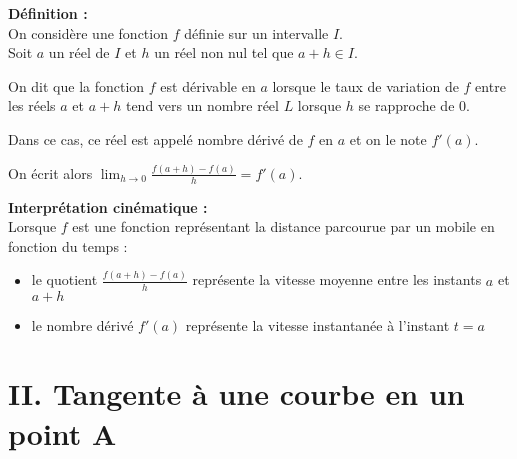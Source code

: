 \documentclass[11pt,a4paper]{article}
\begin{document}
\begin{mdframed}[style=definitionStyle]
    \textbf{Définition :} ~\\
    On considère une fonction $f$ définie sur un intervalle $I$. \\
    Soit $a$ un réel de $I$ et $h$ un réel non nul tel que $a+h\in I$.

    On dit que la fonction $f$ est dérivable en $a$ lorsque le taux de variation de $f$ entre les réels $a$ et $a+h$ tend vers un nombre réel $L$ lorsque $h$ se rapproche de $0$.

    Dans ce cas, ce réel est appelé nombre dérivé de $f$ en $a$ et on le note $f'(a)$.

    On écrit alors $\displaystyle{\lim_{h\to0}%
            \frac{f(a+h)-f(a)}{h}}=f'(a)$.
\end{mdframed}

\textbf{Interprétation cinématique :} \\
Lorsque $f$ est une fonction représentant la distance parcourue par un mobile en fonction du temps :
\begin{itemize}
    \item le quotient $\frac{f(a+h)-f(a)}{h}$ représente la vitesse moyenne entre les instants $a$ et $a+h$
    \item le nombre dérivé $f'(a)$ représente la vitesse instantanée à l'instant $t=a$
\end{itemize}

\newpage

\section*{II. Tangente à une courbe en un point $\boldsymbol{A}$}
\end{document}
